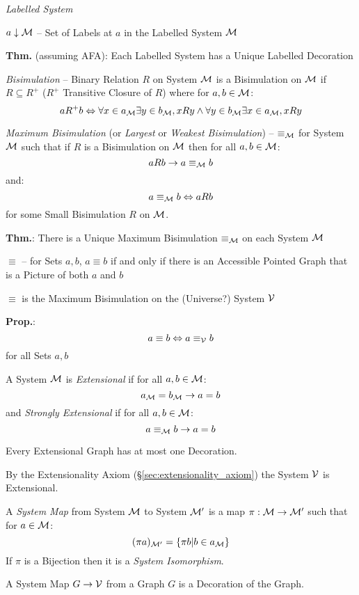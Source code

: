 \emph{Labelled System}

$a \downarrow \mathcal{M}$ -- Set of Labels at $a$ in the Labelled
System $\mathcal{M}$

\textbf{Thm.} (assuming AFA): Each Labelled System has a Unique
Labelled Decoration

\emph{Bisimulation} -- Binary Relation $R$ on System $\mathcal{M}$ is a
Bisimulation on $\mathcal{M}$ if $R \subseteq R^+$ ($R^+$ Transitive
Closure of $R$) where for $a,b \in \mathcal{M}$:
\[
  a R^+ b \Leftrightarrow \forall x \in a_\mathcal{M}
    \exists y \in b_\mathcal{M}, x R y \wedge
    \forall y \in b_\mathcal{M} \exists x \in a_\mathcal{M}, x R y
\]

\emph{Maximum Bisimulation} (or \emph{Largest} or \emph{Weakest
  Bisimulation}) -- $\equiv_\mathcal{M}$ for System $\mathcal{M}$ such
that if $R$ is a Bisimulation on $\mathcal{M}$ then for all $a,b \in
\mathcal{M}$:
\[
  a R b \to a \equiv_\mathcal{M} b
\]
and:
\[
  a \equiv_\mathcal{M} b \Leftrightarrow a R b
\]
for some Small Bisimulation $R$ on $\mathcal{M}$.

\textbf{Thm.}: There is a Unique Maximum Bisimulation
$\equiv_\mathcal{M}$ on each System $\mathcal{M}$

$\equiv$ -- for Sets $a,b$, $a \equiv b$ if and only if there is an
Accessible Pointed Graph that is a Picture of both $a$ and $b$

$\equiv$ is the Maximum Bisimulation on the (Universe?) System
$\mathcal{V}$ %

\textbf{Prop.}:
\[
  a \equiv b \Leftrightarrow a \equiv_\mathcal{V} b
\]
for all Sets $a,b$

A System $\mathcal{M}$ is \emph{Extensional} if for all $a,b \in
\mathcal{M}$:
\[
  a_\mathcal{M} = b_\mathcal{M} \to a = b
\]
and \emph{Strongly Extensional} if for all $a,b \in \mathcal{M}$:
\[
  a \equiv_\mathcal{M} b \to a = b
\]

Every Extensional Graph has at most one Decoration.

By the Extensionality Axiom (\S\ref{sec:extensionality_axiom}) the
System $\mathcal{V}$ is Extensional.

A \emph{System Map} from System $\mathcal{M}$ to System $\mathcal{M}'$ is
a map $\pi : \mathcal{M} \to \mathcal{M}'$ such that for $a \in
\mathcal{M}$:
\[
  (\pi a)_{\mathcal{M}'} = \{ \pi b | b \in a_\mathcal{M} \}
\]
If $\pi$ is a Bijection then it is a \emph{System Isomorphism}.

A System Map $G \to \mathcal{V}$ from a Graph $G$ is a
Decoration of the Graph.

